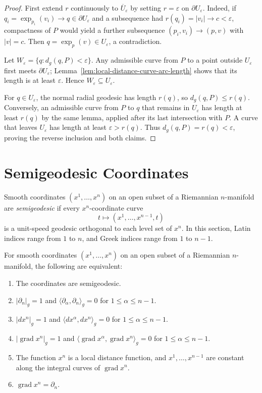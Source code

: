 \begin{proof}
\sketch First extend $r$ continuously to $\overline U_\varepsilon$ by setting
$r=\varepsilon$ on $\partial U_\varepsilon$. Indeed, if
$q_i=\exp_{p_i}(v_i)\to q\in\partial U_\varepsilon$ and a subsequence had
$r(q_i)=|v_i|\to c<\varepsilon$, compactness of $P$ would yield a further
subsequence $(p_i,v_i)\to(p,v)$ with $|v|=c$. Then
$q=\exp_p(v)\in U_\varepsilon$, a contradiction.

Let $W_\varepsilon=\{q:d_g(q,P)<\varepsilon\}$. Any admissible curve from
$P$ to a point outside $U_\varepsilon$ first meets
$\partial U_\varepsilon$; Lemma~\ref{lem:local-distance-curve-arc-length}
shows that its length is at least $\varepsilon$. Hence
$W_\varepsilon\subseteq U_\varepsilon$.

For $q\in U_\varepsilon$, the normal radial geodesic has length $r(q)$, so
$d_g(q,P)\leq r(q)$. Conversely, an admissible curve from $P$ to $q$ that
remains in $U_\varepsilon$ has length at least $r(q)$ by the same lemma,
applied after its last intersection with $P$. A curve that leaves
$U_\varepsilon$ has length at least $\varepsilon>r(q)$. Thus
$d_g(q,P)=r(q)<\varepsilon$, proving the reverse inclusion and both claims.
\end{proof}

\section{Semigeodesic Coordinates}

Smooth coordinates $(x^1,\ldots,x^n)$ on an open subset of a Riemannian
$n$-manifold are \emph{semigeodesic} if every $x^n$-coordinate curve
\[
t\longmapsto(x^1,\ldots,x^{n-1},t)
\]
is a unit-speed geodesic orthogonal to each level set of $x^n$. In this
section, Latin indices range from $1$ to $n$, and Greek indices range from
$1$ to $n-1$.

\begin{proposition}
\label{prop:characterizations-semigeodetic-coordinates}

For smooth coordinates $(x^1,\ldots,x^n)$ on an open subset of a Riemannian
$n$-manifold, the following are equivalent:
\begin{enumerate}
\item[(a)] The coordinates are semigeodesic.
\item[(b)] $|\partial_n|_g=1$ and
$\langle\partial_\alpha,\partial_n\rangle_g=0$ for
$1\leq\alpha\leq n-1$.
\item[(c)] $|dx^n|_g=1$ and
$\langle dx^\alpha,dx^n\rangle_g=0$ for
$1\leq\alpha\leq n-1$.
\item[(d)] $|\operatorname{grad}x^n|_g=1$ and
$\langle\operatorname{grad}x^\alpha,\operatorname{grad}x^n\rangle_g=0$ for
$1\leq\alpha\leq n-1$.
\item[(e)] The function $x^n$ is a local distance function, and
$x^1,\ldots,x^{n-1}$ are constant along the integral curves of
$\operatorname{grad}x^n$.
\item[(f)] $\operatorname{grad}x^n=\partial_n$.
\end{enumerate}
\end{proposition}

